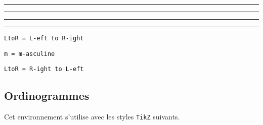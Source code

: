 \documentclass[12pt,a4paper]{article}
\theoremstyle{definition}
\newcommand\separation{
    \medskip
    \hfill\rule{0.5\textwidth}{0.75pt}\hfill
    \medskip
}
\newcommand\extraspace{
    \vspace{0.25em}
}
\newcommand\mwhyprefix[2]{%
    \texttt{#1 = #1-#2}%
}
\newcommand\prefix[1]{%
    \texttt{#1}%
}
\begin{document}





\separation








\separation




\extraspace






\separation






\separation


    \hfill \prefix{LtoR = L-eft to R-ight}

   \hfill \mwhyprefix{m}{asculine}

\extraspace

    \hfill \prefix{LtoR = R-ight to L-eft}





















\subsection{Ordinogrammes}




Cet environnement s'utilise avec les styles \verb#TikZ# suivants.
\end{document}
